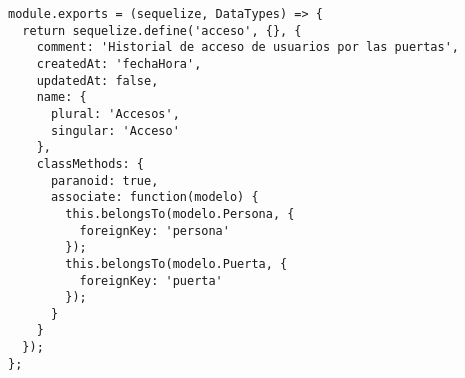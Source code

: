 \begin{lstlisting}[label=anx:modelo_acceso]
module.exports = (sequelize, DataTypes) => {
  return sequelize.define('acceso', {}, {
    comment: 'Historial de acceso de usuarios por las puertas',
    createdAt: 'fechaHora',
    updatedAt: false,
    name: {
      plural: 'Accesos',
      singular: 'Acceso'
    },
    classMethods: {
      paranoid: true,
      associate: function(modelo) {
        this.belongsTo(modelo.Persona, {
          foreignKey: 'persona'
        });
        this.belongsTo(modelo.Puerta, {
          foreignKey: 'puerta'
        });
      }
    }
  });
};
\end{lstlisting}